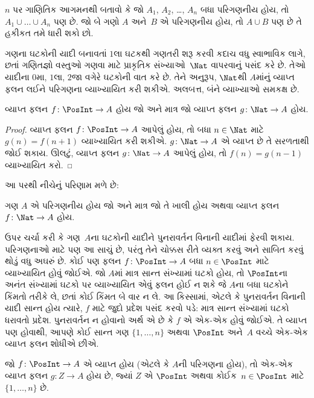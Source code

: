 \begin{prob}
$n$ પર ગાણિતિક આગમનથી બતાવો કે જો $A_1$, $A_2$,
\dots, $A_n$ બધા પરિગણનીય હોય, તો
$A_1 \cup \dots \cup A_n$ પણ છે.
જો બે ગણો $A$ અને~$B$ એ પરિગણનીય હોય,
તો $A \cup
B$ પણ છે તે હકીકત તમે ધારી શકો છો.
\end{prob}

ગણના ઘટકોની યાદી બનાવતાં $1$લા ઘટકથી
ગણતરી શરૂ કરવી કદાચ વધુ સ્વાભાવિક લાગે, છતાં ગણિતજ્ઞો
વસ્તુઓ ગણવા માટે પ્રાકૃતિક સંખ્યાઓ~$\Nat$ વાપરવાનું
પસંદ કરે છે. તેઓ યાદીના $0$મા, $1$લા, $2$જા વગેરે
ઘટકોની વાત કરે છે. તેને અનુરૂપ,
$\Nat$થી $A$માંનું વ્યાપ્ત ફલન લઈને
પરિગણના વ્યાખ્યાયિત કરી શકીએ. અલબત્ત, બંને વ્યાખ્યાઓ
સમકક્ષ છે.

\begin{prop}
વ્યાપ્ત ફલન $f\colon \PosInt \to A$ હોય
જો અને માત્ર જો વ્યાપ્ત ફલન $g\colon \Nat \to A$ હોય.
\end{prop}

\begin{proof}
વ્યાપ્ત ફલન $f\colon \PosInt \to A$ આપેલું હોય,
તો બધા $n \in \Nat$ માટે $g(n) =
f(n+1)$ વ્યાખ્યાયિત કરી શકીએ.
$g\colon \Nat
\to A$ એ વ્યાપ્ત છે તે સરળતાથી જોઈ શકાય.
ઊલટું, વ્યાપ્ત ફલન $g\colon
\Nat \to A$ આપેલું હોય, તો $f(n) = g(n-1)$ વ્યાખ્યાયિત કરો.
\end{proof}

આ પરથી નીચેનું પરિણામ મળે છે:

\begin{cor}
ગણ $A$ એ પરિગણનીય હોય જો અને માત્ર જો
તે ખાલી હોય અથવા વ્યાપ્ત ફલન
$f\colon \Nat \to A$ હોય.
\end{cor}

ઉપર ચર્ચા કરી કે ગણ~$A$ના ઘટકોની યાદીને
પુનરાવર્તન વિનાની યાદીમાં ફેરવી શકાય. પરિગણનાઓ માટે
પણ આ સાચું છે, પરંતુ તેને ચોક્કસ રીતે વ્યક્ત કરવું
અને સાબિત કરવું થોડું વધુ અઘરું છે. કોઈ પણ ફલન
$f\colon \PosInt \to A$ બધા $n \in
\PosInt$ માટે વ્યાખ્યાયિત હોવું જોઈએ. જો $A$માં
માત્ર સાન્ત સંખ્યામાં ઘટકો હોય, તો
$\PosInt$ના અનંત સંખ્યામાં ઘટકો પર
વ્યાખ્યાયિત એવું ફલન હોઈ ન શકે જે $A$ના બધા
ઘટકોને કિંમતો તરીકે લે, છતાં કોઈ કિંમત
બે વાર ન લે. આ કિસ્સામાં, એટલે કે પુનરાવર્તન
વિનાની યાદી સાન્ત હોય ત્યારે, $f$ માટે જુદો પ્રદેશ
પસંદ કરવો પડે: માત્ર સાન્ત સંખ્યામાં ઘટકો
ધરાવતો પ્રદેશ. પુનરાવર્તન ન હોવાનો અર્થ એ છે
કે $f$ એ એક-એક હોવું જોઈએ. તે
વ્યાપ્ત પણ હોવાથી, આપણે કોઈ સાન્ત ગણ
$\{1, \dots, n\}$ અથવા $\PosInt$ અને~$A$
વચ્ચે એક-એક વ્યાપ્ત ફલન શોધીએ છીએ.

\begin{prop}
જો $f\colon \PosInt \to A$ એ વ્યાપ્ત
હોય (એટલે કે $A$ની પરિગણના હોય), તો
એક-એક વ્યાપ્ત ફલન $g\colon Z \to A$ હોય છે, જ્યાં
$Z$ એ $\PosInt$ અથવા કોઈક~$n \in \PosInt$
માટે $\{1, \dots, n\}$ છે.
\end{prop}

